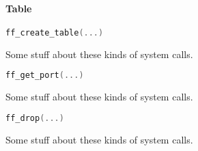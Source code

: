 \paragraph{Table}



\begin{lstlisting}[language=c++]
ff_create_table(...)
\end{lstlisting}
Some stuff about these kinds of system calls.

\begin{lstlisting}[language=c++]
ff_get_port(...)
\end{lstlisting}
Some stuff about these kinds of system calls.

\begin{lstlisting}[language=c++]
ff_drop(...)
\end{lstlisting}
Some stuff about these kinds of system calls.
